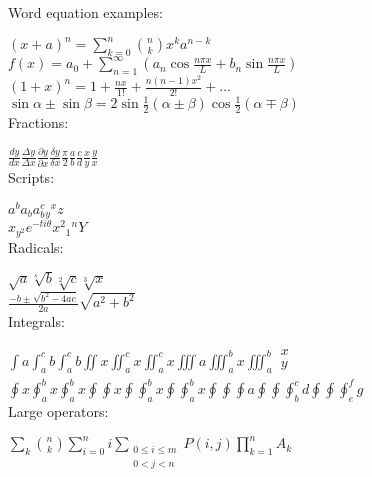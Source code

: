\documentclass[12pt,a4paper]{article}
\begin{document}
Word equation examples:

$(x+a)^{n}=\sum_{k=0}^{n}{\binom{n}{k}x^{k}a^{n-k}}$\\


$f(x)=a_{0}+\sum_{n=1}^{\infty }{(a_{n}\cos \frac{n\pi x}{L}+b_{n}\sin 
\frac{n\pi x}{L})}$\\


$(1+x)^{n}=1+\frac{nx}{1!}+\frac{n(n-1)x^{2}}{2!}+\ldots $\\


$\sin \alpha \pm \sin \beta =2\sin \frac{1}{2}(\alpha \pm \beta )\cos 
\frac{1}{2}(\alpha \mp \beta )$\\




Fractions:

$\frac{dy}{dx}\frac{\Delta y}{\Delta x}\frac{\partial y}{\partial 
x}\frac{\delta y}{\delta x}\frac{\pi 
}{2}\frac{a}{b}\frac{c}{d}\frac{x}{y}\frac{y}{x}$\\


Scripts:

$a^{b} a_{b }a_{b}^{c}{}_{ y}{}^{x}z$\\


$x_{y^{2}}e^{-ti\theta }x^{2}{}_{1}{}^{n}Y$\\


Radicals:

$\sqrt{a}\sqrt[s]{b}\sqrt[2]{c}\sqrt[3]{x}$\\


$\frac{-b\pm \sqrt{b^{2}-4ac}}{2a}\sqrt{a^{2}+b^{2}}$\\


Integrals:

$
\int{a\int_{a}^{c}{b}}\int_{a}^{c}{b}\iint{x}\iint_{a}^{c}{x}\iint_{a}^{c}{x}\iiint{a}\iiint_{a}^{b}{x}\iiint_{a}^{b}{
\begin{gathered}
x \\
y \\
\end{gathered}
}$\\




$
\oint{x}\oint_{a}^{b}{x\oint_{a}^{b}{x\oint\oint{x\oint\oint_{a}^{b}{x\oint\oint_{a}^{b}{x}}}}}\oint\oint\oint{a}\oint\oint\oint_{b}^{c}{d}\oint\oint\oint_{e}^{f}{g}
$\\


Large operators:

$\sum_{k}{\binom{n}{k}}\sum_{i=0}^{n}{i\sum_{
\begin{gathered}
0\le i \le m \\
0<j<n \\
\end{gathered}
}{P(i,j)}\prod_{k=1}^{n}{A_{k}}}$\\
\end{document}
